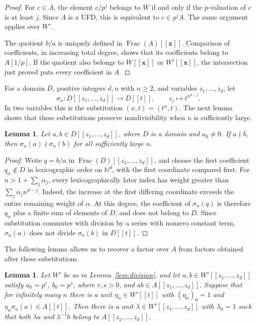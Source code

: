 \documentclass[11pt]{amsart}
\newtheorem{lemma}[theorem]{Lemma}
\theoremstyle{remark}
\newcommand{\N}{\mathbb N}
\DeclareMathOperator{\Frac}{Frac}
\newcommand{\xx}{\boldsymbol{x}}
\begin{document}
\begin{proof}
For $c\in A$, the element $c/p^j$ belongs to $W$ if and only if
the $p$-valuation of $c$ is at least $j$. Since $A$ is a UFD,
this is equivalent to $c\in p^jA$. The same argument applies
over $W'$.

The quotient $b/a$ is uniquely defined in $\Frac(A)[[\xx]]$.
Comparison of coefficients, in increasing total degree, shows that
its coefficients belong to $A[1/p]$. If the quotient also belongs
to $W[[\xx]]$ or $W'[[\xx]]$, the intersection just proved puts
every coefficient in $A$.
\end{proof}

For a domain $D$, positive integers $d,n$ with $n\geq2$, and
variables $z_1,\ldots,z_d$, let
\[
 \sigma_n:D[[z_1,\ldots,z_d]]\longrightarrow D[[t]],\qquad
 z_j\longmapsto t^{n^{d-j}}.
\]
In two variables this is the substitution $(x,t)=(t^n,t)$.
The next lemma shows that these substitutions preserve
nondivisibility when $n$ is sufficiently large.

\begin{lemma}\label{lem:detector}
Let $a,b\in D[[z_1,\ldots,z_d]]$, where $D$ is a domain and
$a_0\ne0$. If $a\nmid b$, then
$\sigma_n(a)\nmid\sigma_n(b)$ for all sufficiently large $n$.
\end{lemma}

\begin{proof}
Write $q=b/a$ in $\Frac(D)[[z_1,\ldots,z_d]]$, and choose the
first coefficient $q_\alpha\notin D$ in lexicographic order on
$\N^d$, with the first coordinate compared first. For
$n>1+\sum_j\alpha_j$, every lexicographically later index has
weight greater than $\sum_j\alpha_j n^{d-j}$. Indeed, the increase
at the first differing coordinate exceeds the entire remaining
weight of $\alpha$. At this degree, the coefficient of
$\sigma_n(q)$ is therefore $q_\alpha$ plus a finite sum of
elements of $D$, and does not belong to $D$. Since substitution
commutes with division by a series with nonzero constant term,
$\sigma_n(a)$ does not divide $\sigma_n(b)$ in $D[[t]]$.
\end{proof}

The following lemma allows us to recover a factor over $A$ from
factors obtained after these substitutions.

\begin{lemma}\label{lem:descent}
Let $W'$ be as in Lemma~\ref{lem:division}, and let
$a,b\in W'[[z_1,\ldots,z_d]]$ satisfy $a_0=p^r$, $b_0=p^s$,
where $r,s>0$, and $ab\in A[[z_1,\ldots,z_d]]$. Suppose that
for infinitely many $n$ there is a unit $\eta_n\in W'[[t]]$ with
$(\eta_n)_0=1$ and $\eta_n\sigma_n(a)\in A[[t]]$.
Then there is a unit $\lambda\in W'[[z_1,\ldots,z_d]]$ with
$\lambda_0=1$ such that both $\lambda a$ and $\lambda^{-1}b$
belong to $A[[z_1,\ldots,z_d]]$.
\end{lemma}
\end{document}
